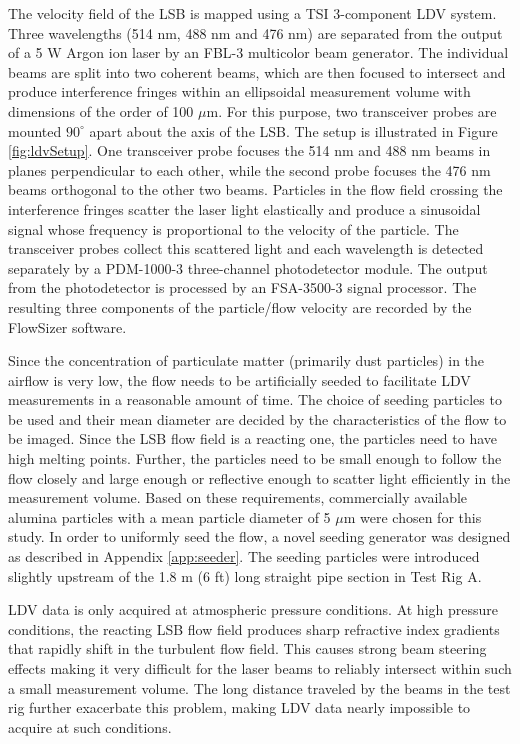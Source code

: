 The velocity field of the LSB is mapped using a TSI 3-component LDV system.
Three wavelengths (514 nm, 488 nm and 476 nm) are separated from the output of a 5 W Argon ion laser by an FBL-3 multicolor beam generator.
The individual beams are split into two coherent beams, which are then focused to intersect and produce interference fringes within an ellipsoidal measurement volume with dimensions of the order of 100 \(\mu\)m.
For this purpose, two transceiver probes are mounted \(90^\circ\) apart about the axis of the LSB.
The setup is illustrated in Figure \ref{fig:ldvSetup}.
One transceiver probe focuses the 514 nm and 488 nm beams in planes perpendicular to each other, while the second probe focuses the 476 nm beams orthogonal to the other two beams.
Particles in the flow field crossing the interference fringes scatter the laser light elastically and produce a sinusoidal signal whose frequency is proportional to the velocity of the particle.
The transceiver probes collect this scattered light and each wavelength is detected separately by a PDM-1000-3 three-channel photodetector module.
The output from the photodetector is processed by an FSA-3500-3 signal processor.
The resulting three components of the particle/flow velocity are recorded by the FlowSizer software.

Since the concentration of particulate matter (primarily dust particles) in the airflow is very low, the flow needs to be artificially seeded to facilitate LDV measurements in a reasonable amount of time.
The choice of seeding particles to be used and their mean diameter are decided by the characteristics of the flow to be imaged.\cite{1997-melling}
Since the LSB flow field is a reacting one, the particles need to have high melting points.
Further, the particles need to be small enough to follow the flow closely and large enough or reflective enough to scatter light efficiently in the measurement volume.
Based on these requirements, commercially available alumina particles with a mean particle diameter of 5 \(\mu\)m were chosen for this study.
In order to uniformly seed the flow, a novel seeding generator was designed as described in Appendix \ref{app:seeder}.
The seeding particles were introduced slightly upstream of the 1.8 m (6 ft) long straight pipe section in Test Rig A.

LDV data is only acquired at atmospheric pressure conditions.
At high pressure conditions, the reacting LSB flow field produces sharp refractive index gradients that rapidly shift in the turbulent flow field.
This causes strong beam steering effects making it very difficult for the laser beams to reliably intersect within such a small measurement volume.\cite{1997-hemmerling}
The long distance traveled by the beams in the test rig further exacerbate this problem, making LDV data nearly impossible to acquire at such conditions.

